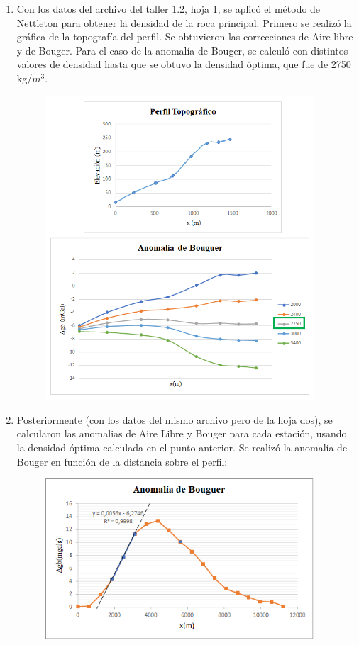 \documentclass{article}
\begin{document}
\begin{enumerate}%
\item Con los datos del archivo del taller 1.2, hoja 1, se aplic\'o el m\'etodo de Nettleton para obtener la densidad de la roca principal. Primero se realiz\'o la gr\'afica de la topograf\'ia del perfil. Se obtuvieron las correcciones de Aire libre y de Bouger. Para el caso de la anomal\'ia de Bouger, se calcul\'o con distintos valores de densidad hasta que se obtuvo la densidad \'optima, que fue de 2750 kg/$m^{3}$.
\begin{figure}[H]\centering
\includegraphics[width=10cm]{Densidad.png}
\end{figure}
\item Posteriormente (con los datos del mismo archivo pero de la hoja dos), se calcularon las anomalias de Aire Libre y Bouger para cada estaci\'on, usando la densidad \'optima calculada en el punto anterior. Se realiz\'o la anomal\'ia de Bouger en funci\'on de la distancia sobre el perfil:
\begin{figure}[H]\centering
\includegraphics[width=10cm]{Volcan.png}

\end{figure}
\end{enumerate}
\end{document}

